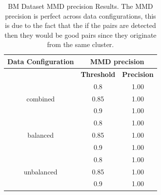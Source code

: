 \documentclass{mpaper}
\begin{document}
\begin{table}[]
\centering
\begin{tabular}{|c|cc|}
\hline
\textbf{Data Configuration} & \multicolumn{2}{c|}{\textbf{MMD precision}}                  \\ \hline
\textbf{}                   & \multicolumn{1}{c|}{\textbf{Threshold}} & \textbf{Precision} \\ \hline
                            & \multicolumn{1}{c|}{0.8}                & 1.00               \\
combined                    & \multicolumn{1}{c|}{0.85}               & 1.00               \\
                            & \multicolumn{1}{c|}{0.9}                & 1.00               \\ \hline
                            & \multicolumn{1}{c|}{0.8}                & 1.00               \\
balanced                    & \multicolumn{1}{c|}{0.85}               & 1.00               \\
                            & \multicolumn{1}{c|}{0.9}                & 1.00               \\ \hline
                            & \multicolumn{1}{c|}{0.8}                & 1.00               \\
unbalanced                  & \multicolumn{1}{c|}{0.85}               & 1.00               \\
                            & \multicolumn{1}{c|}{0.9}                & 1.00               \\ \hline
\end{tabular}
\caption{\label{tab:bm_mmd_precision}BM Dataset MMD precision Results. The MMD precision is perfect across data configurations, this is due to the fact that the if the pairs are detected then they would be good pairs since they originate from the same cluster. }
\end{table}

\end{document}
